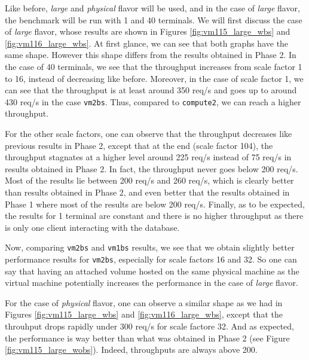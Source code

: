 Like before, \textit{large} and \textit{physical} flavor will be used, and in the case of \textit{large} flavor, the benchmark will be run with 1 and 40 terminals. 
We will first discuss the case of \textit{large} flavor, whose results are shown in Figures \ref{fig:vm115_large_wbs} and \ref{fig:vm116_large_wbs}.
At first glance, we can see that both graphs have the same shape. However this shape differs from the results obtained in Phase 2. 
In the case of 40 terminals, we see that the throughput increases from scale factor 1 to 16, instead of decreasing like before. 
Moreover, in the case of scale factor 1, we can see that the throughput is at least around 350 req/s and goes up to around 430 req/s in the case \texttt{vm2bs}.
Thus, compared to \texttt{compute2}, we can reach a higher throughput.

For the other scale factors, one can observe that the throughput decreases like previous results in Phase 2, except that at the end (scale factor 104), the throughput stagnates at a higher level around 225 req/s instead of 75 req/s in results obtained in Phase 2. 
In fact, the throughput never goes below 200 req/s. 
Most of the results lie between 200 req/s and 260 req/s, which is clearly better than results obtained in Phase 2, and even better that the results obtained in Phase 1 where most of the results are below 200 req/s. 
Finally, as to be expected, the results for 1 terminal are constant and there is no higher throughput as there is only one client interacting with the database. 

Now, comparing \texttt{vm2bs} and \texttt{vm1bs} results, we see that we obtain slightly better performance results for \texttt{vm2bs}, especially for scale factors 16 and 32. 
So one can say that having an attached volume hosted on the same physical machine as the virtual machine potentially increases the performance in the case of \textit{large} flavor.

For the case of \textit{physical} flavor, one can observe a similar shape as we had in Figures \ref{fig:vm115_large_wbs} and \ref{fig:vm116_large_wbs}, except that the throuhput drops rapidly under 300 req/s for scale factore 32.
And as expected, the performance is way better than what was obtained in Phase 2 (see Figure \ref{fig:vm115_large_wobs}). 
Indeed, throughputs are always above 200.

